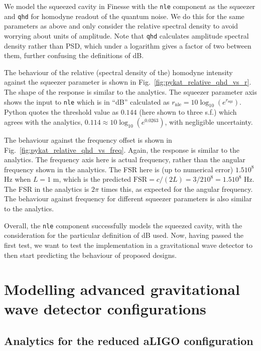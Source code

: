 \documentclass[aps,pra,superscriptaddress,reprint,nofootinbib]{revtex4-1}
\newcommand{\code}[1]{\texttt{#1}}
\begin{document}
We model the squeezed cavity in Finesse with the \code{nle} component as the squeezer and \code{qhd} for homodyne readout of the quantum noise. We do this for the same parameters as above and only consider the relative spectral density to avoid worrying about units of amplitude. Note that \code{qhd} calculates amplitude spectral density rather than PSD, which under a logarithm gives a factor of two between them, further confusing the definitions of dB.


The behaviour of the relative (spectral density of the) homodyne intensity against the squeezer parameter is shown in Fig.~\ref{fig:pykat_relative_qhd_vs_r}. The shape of the response is similar to the analytics. The squeezer parameter axis shows the input to \code{nle} which is in ``dB'' calculated as $r_{\mathrm{nle}} = 10 \log_{10}(e^{r_\mathrm{sqz}})$. Python quotes the threshold value as $0.144$ (here shown to three s.f.) which agrees with the analytics, $0.114 \approx 10 \log_{10}(e^{0.0263})$, with negligible uncertainty.


The behaviour against the frequency offset is shown in Fig.~\ref{fig:pykat_relative_qhd_vs_freq}. Again, the response is similar to the analytics. The frequency axis here is actual frequency, rather than the angular frequency shown in the analytics. The FSR here is (up to numerical error) $1.5 10^8$ Hz when $L = 1$ m, which is the predicted $\mathrm{FSR} = c/(2 L) = 3/2 10^8 = 1.5 10^8$ Hz. The FSR in the analytics is $2 \pi$ times this, as expected for the angular frequency. The behaviour against frequency for different squeezer parameters is also similar to the analytics.


Overall, the \code{nle} component successfully models the squeezed cavity, with the consideration for the particular definition of dB used. Now, having passed the first test, we want to test the implementation in a gravitational wave detector to then start predicting the behaviour of proposed designs.


\section{Modelling advanced gravitational wave detector configurations}
\label{sec:aLIGOcomparison}

\subsection{Analytics for the reduced aLIGO configuration}
\end{document}
